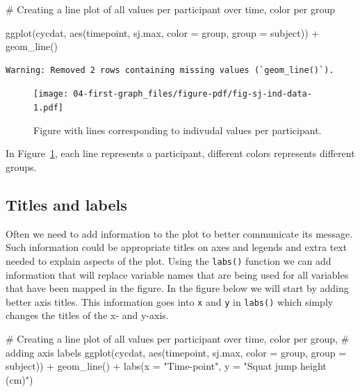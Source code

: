 \documentclass[
  11pt,
  letterpaper,
]{scrbook}
\newenvironment{Shaded}{\begin{snugshade}}{\end{snugshade}}
\newcommand{\AttributeTok}[1]{\textcolor[rgb]{0.40,0.45,0.13}{#1}}
\newcommand{\CommentTok}[1]{\textcolor[rgb]{0.37,0.37,0.37}{#1}}
\newcommand{\FunctionTok}[1]{\textcolor[rgb]{0.28,0.35,0.67}{#1}}
\newcommand{\NormalTok}[1]{\textcolor[rgb]{0.00,0.23,0.31}{#1}}
\newcommand{\SpecialCharTok}[1]{\textcolor[rgb]{0.37,0.37,0.37}{#1}}
\newcommand{\StringTok}[1]{\textcolor[rgb]{0.13,0.47,0.30}{#1}}
\begin{document}
\begin{Shaded}
\begin{Highlighting}[numbers=left,,]
\CommentTok{\# Creating a line plot of all values per participant over time, color per group}

\FunctionTok{ggplot}\NormalTok{(cycdat, }\FunctionTok{aes}\NormalTok{(timepoint, sj.max, }\AttributeTok{color =}\NormalTok{ group, }\AttributeTok{group =}\NormalTok{ subject)) }\SpecialCharTok{+} 
\FunctionTok{geom\_line}\NormalTok{()}
\end{Highlighting}
\end{Shaded}

\begin{verbatim}
Warning: Removed 2 rows containing missing values (`geom_line()`).
\end{verbatim}

\begin{figure}[H]

{\centering \texttt{[image: 04-first-graph\_files/figure-pdf/fig-sj-ind-data-1.pdf]}

}

\caption{\label{fig-sj-ind-data}Figure with lines corresponding to
indivudal values per participant.}

\end{figure}

In Figure~\ref{fig-sj-ind-data}, each line represents a participant,
different colors represents different groups.

\hypertarget{titles-and-labels}{%
\subsection{Titles and labels}\label{titles-and-labels}}

Often we need to add information to the plot to better communicate its
message. Such information could be appropriate titles on axes and
legends and extra text needed to explain aspects of the plot. Using the
\texttt{labs()} function we can add information that will replace
variable names that are being used for all variables that have been
mapped in the figure. In the figure below we will start by adding better
axis titles. This information goes into \texttt{x} and \texttt{y} in
\texttt{labs()} which simply changes the titles of the x- and y-axis.

\begin{Shaded}
\begin{Highlighting}[numbers=left,,]
\CommentTok{\# Creating a line plot of all values per participant over time, color per group, }
\CommentTok{\# adding axis labels}
\FunctionTok{ggplot}\NormalTok{(cycdat, }\FunctionTok{aes}\NormalTok{(timepoint, sj.max, }\AttributeTok{color =}\NormalTok{ group, }\AttributeTok{group =}\NormalTok{ subject)) }\SpecialCharTok{+} 
  \FunctionTok{geom\_line}\NormalTok{() }\SpecialCharTok{+}
  \FunctionTok{labs}\NormalTok{(}\AttributeTok{x =} \StringTok{"Time{-}point"}\NormalTok{,}
       \AttributeTok{y =} \StringTok{"Squat jump height (cm)"}\NormalTok{)}
\end{Highlighting}
\end{Shaded}
\end{document}
